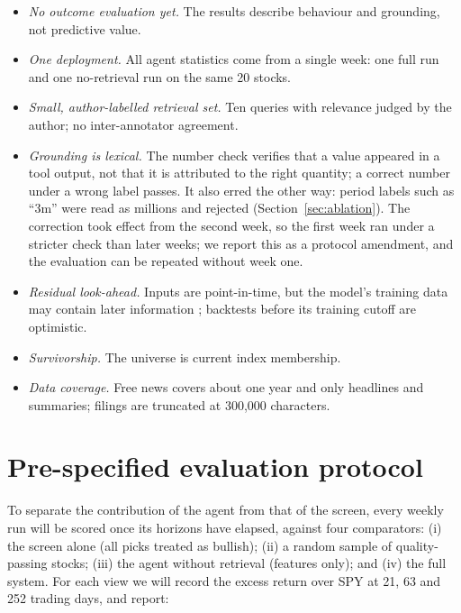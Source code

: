 \documentclass[preprint,11pt]{elsarticle}
\begin{document}
\begin{itemize}
  \item \emph{No outcome evaluation yet.} The results describe behaviour and grounding, not predictive value.
  \item \emph{One deployment.} All agent statistics come from a single week: one full run and one
        no-retrieval run on the same 20 stocks.
  \item \emph{Small, author-labelled retrieval set.} Ten queries with relevance judged by the author; no
        inter-annotator agreement.
  \item \emph{Grounding is lexical.} The number check verifies that a value appeared in a tool output, not that
        it is attributed to the right quantity; a correct number under a wrong label passes. It also
        erred the other way: period labels such as ``3m'' were read as millions and rejected
        (Section~\ref{sec:ablation}). The correction took effect from the second week, so the first week
        ran under a stricter check than later weeks; we report this as a protocol amendment, and the
        evaluation can be repeated without week one.
  \item \emph{Residual look-ahead.} Inputs are point-in-time, but the model's training data may contain later
        information \cite{glasserman2023assessing}; backtests before its training cutoff are optimistic.
  \item \emph{Survivorship.} The universe is current index membership.
  \item \emph{Data coverage.} Free news covers about one year and only headlines and summaries; filings are
        truncated at 300{,}000 characters.
\end{itemize}

\section{Pre-specified evaluation protocol}
\label{sec:protocol}

To separate the contribution of the agent from that of the screen, every weekly run will be scored once its
horizons have elapsed, against four comparators: (i) the screen alone (all picks treated as bullish);
(ii) a random sample of quality-passing stocks; (iii) the agent without retrieval (features only); and (iv) the
full system. For each view we will record the excess return over SPY at 21, 63 and 252 trading days, and
report:
\end{document}
